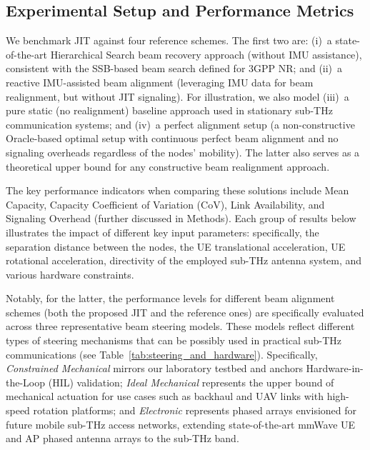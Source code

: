 \documentclass[fleqn,10pt]{wlscirep}
\newcommand{\rev}[1]{{\color{revblue}#1}}
\newcommand{\moved}[1]{{\color{revmagenta}#1}}
\begin{document}
\rev{\subsection*{Experimental Setup and Performance Metrics}}

We benchmark JIT against four reference schemes. The first two are: (i)~a \rev{state-of-the-art Hierarchical Search beam recovery approach (without IMU assistance)\cite{photonics11060540}, consistent with the SSB-based beam search defined for 3GPP NR\cite{Giordani2018ATO, Heng2021SixChallenges}}; and (ii)~a reactive IMU-assisted beam alignment (leveraging IMU data for beam realignment, but without JIT signaling)\rev{\cite{s141019622, Brambilla_2019, 9391649}}. For illustration, we also model (iii)~a pure static (no realignment) baseline approach used in stationary sub-THz communication systems; and (iv)~a perfect alignment setup (a non-constructive Oracle-based optimal setup with continuous perfect beam alignment and no signaling overheads regardless of the nodes' mobility). The latter also serves as a theoretical upper bound for any constructive beam realignment approach.

\moved{The key performance indicators when comparing these solutions include Mean Capacity, Capacity Coefficient of Variation (CoV), Link Availability, and Signaling Overhead (further discussed in Methods). Each group of results below illustrates the impact of different key input parameters: specifically, the separation distance between the nodes, the UE translational acceleration, UE rotational acceleration, directivity of the employed sub-THz antenna system, and various hardware constraints.}

\moved{Notably, for the latter, the performance levels for different beam alignment schemes (both the proposed JIT and the reference ones) are specifically evaluated across three representative beam steering models. These models reflect different types of steering mechanisms that can be possibly used in practical sub-THz communications (see Table~\ref{tab:steering_and_hardware}). Specifically, \textit{Constrained Mechanical} mirrors our laboratory testbed and anchors Hardware-in-the-Loop (HIL) validation; \textit{Ideal Mechanical} represents the upper bound of mechanical actuation for use cases such as backhaul and UAV links with high-speed rotation platforms; and \textit{Electronic} represents phased arrays envisioned for future mobile sub-THz access networks, extending state-of-the-art mmWave UE and AP phased antenna arrays to the sub-THz band.}
\end{document}
